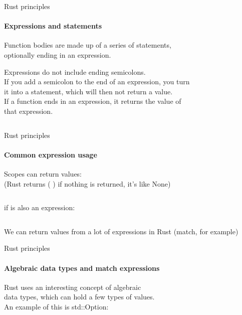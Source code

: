 \documentclass[usenames,dvipsnames,10pt,aspectratio=169]{beamer}
\begin{document}
\begin{frame}{Rust principles}
\framesubtitle{Expressions and statements}
\normalsize
Function bodies are made up of a series of statements, \\
optionally ending in an expression.

\vspace{0.4cm}
Expressions do not include ending semicolons.\\

\vspace{0.4cm}
If you add a semicolon to the end of an expression, you turn \\
it into a statement, which will then not return a value.\\
If a function ends in an expression, it returns the value of\\
that expression.
\vspace{0.5cm}
\inputminted[fontsize=\large]{rust}{code/expression2.rs}
\vspace{0.5cm}
\end{frame}

\begin{frame}{Rust principles}
\framesubtitle{Common expression usage}
\large
Scopes can return values:\\
(Rust returns \textcolor{ucuyellow}{( )} if nothing is returned, it's like None)
\inputminted[fontsize=\large]{rust}{code/expression3.rs}
\vspace{0.7cm}
\textcolor{ucuyellow}{if}
is also an expression:
\inputminted[fontsize=\large]{rust}{code/expression4.rs}
\vspace{0.5cm}
\normalsize
We can return values from a lot of expressions in Rust 
(\textcolor{ucuyellow}{match}, for example)
\end{frame}

\begin{frame}{Rust principles}
\framesubtitle{Algebraic data types and match expressions}
\large
Rust uses an interesting concept of algebraic \\
data types, which can hold a few types of values.\\ 
An example of this is \textcolor{ucuyellow}{std::Option}:\\
\vspace{0.2cm}
\inputminted[fontsize=\Large]{rust}{code/option1.rs}
\vspace{0.4cm}
\end{frame}
\end{document}
